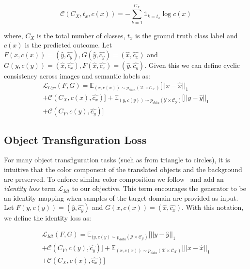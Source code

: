\begin{equation}
\mathcal{C}(C_X,t_x,c(x)) = -\sum_{k=1}^{C_X}\mathds{1}_{k=t_x}\log c(x)
\label{eq:losscrossentropy}
\end{equation}

where, $C_X$ is the total number of classes, $t_x$ is the ground truth class label and $c(x)$ is the predicted outcome. Let $F(x,c(x)) = (\hat{y},\hat{c_y}), G(\hat{y},\hat{c_y}) = (\hat{x},\hat{c_x})$ and $G(y,c(y)) = (\hat{x},\hat{c_x}), F(\hat{x},\hat{c_x}) = (\hat{y},\hat{c_y})$. Given this we can define cyclic consistency across images and semantic labels as: 
\begin{equation}
\begin{aligned}
\mathcal{L}_{Cyc}(F, G) = \mathbb{E}_{(x,c(x)) \sim p_{data}(\mathcal{X \times C_X})}[||x- \hat{x}||_1 \\ + \mathcal{C}(C_X,c(x),\hat{c_x})]  + \mathbb{E}_{(y,c(y)) \sim p_{data}(\mathcal{Y \times C_Y})}[||y-\hat{y}||_1 \\ + \mathcal{C}(C_Y,c(y),\hat{c_y})] 
\end{aligned}
\label{eq:losscyclic}
\end{equation}


\subsection{Object Transfiguration Loss}\label{subsec:idtloss}
For many object transfiguration tasks (such as from triangle to circles), it is intuitive that the color component of the translated objects and the background are preserved. 
To enforce similar color composition we follow~\cite{zhu_unpaired_2017,taigman_unsupervised_2016} and add an \textit{identity loss} term $\mathcal{L}_{Idt}$ to our objective. This term encourages the generator to be an identity mapping when samples of the target domain are provided as input. 
Let $F(y,c(y)) = (\hat{y},\hat{c_{y}})$ and $G(x,c(x)) = (\hat{x},\hat{c_{x}})$. With this notation, we define the identity loss as:

\begin{equation}
\begin{aligned}
\mathcal{L}_{Idt}(F, G) = \mathbb{E}_{(y,c(y) \sim p_{data}(\mathcal{Y \times C_Y})}[||y- \hat{y}||_1 \\ + \mathcal{C}(C_Y,c(y),\hat{c_y})]  + \mathbb{E}_{(x,c(x)) \sim p_{data}(\mathcal{X \times C_X})}[||x - \hat{x}||_1 \\ + \mathcal{C}(C_X,c(x),\hat{c_x})] 
\end{aligned}
\label{eq:lossidt}
\end{equation}

